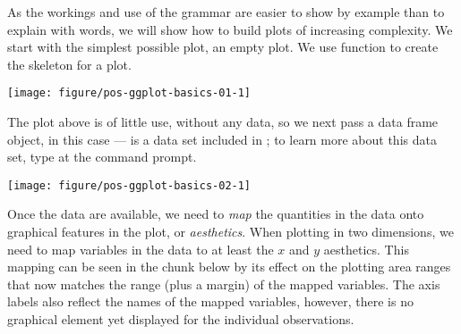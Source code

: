 \documentclass[krantz2]{krantz}\usepackage{knitr}%
\begin{document}
As the workings and use of the grammar are easier to show by example than to explain with words, we will show how to build plots of increasing complexity.
We start with the simplest possible plot, an empty plot. We use function  to create the skeleton for a plot.

\begin{knitrout}\footnotesize
{}\color{fgcolor}\begin{kframe}
\begin{alltt}
\hlstd{()}
\end{alltt}
\end{kframe}

{\centering \texttt{[image: figure/pos-ggplot-basics-01-1]} 

}



\end{knitrout}

The plot above is of little use, without any data, so we next pass a data frame object, in this case --- is a data set included in \Rlang; to learn more about this data set, type  at the \Rlang command prompt.

\begin{knitrout}\footnotesize
{}\color{fgcolor}\begin{kframe}
\begin{alltt}
\hlstd{(} 
\end{alltt}
\end{kframe}

{\centering \texttt{[image: figure/pos-ggplot-basics-02-1]} 

}



\end{knitrout}

Once the data are available, we need to \emph{map} the quantities in the data onto graphical features in the plot, or \emph{aesthetics}. When plotting in two dimensions, we need to map variables in the data to at least the $x$ and $y$ aesthetics. This mapping can be seen in the chunk below by its effect on the plotting area ranges that now matches the range (plus a margin) of the mapped variables. The axis labels also reflect the names of the mapped variables, however, there is no graphical element yet displayed for the individual observations.
\end{document}
